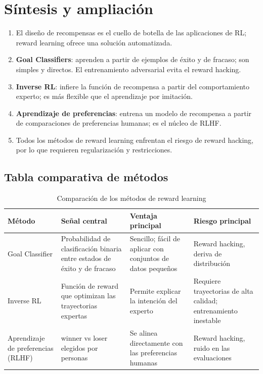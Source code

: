 \section{Síntesis y ampliación}

\begin{enumerate}
    \item El diseño de recompensas es el cuello de botella de las aplicaciones de RL; reward learning ofrece una solución automatizada.
    \item \textbf{Goal Classifiers}: aprenden a partir de ejemplos de éxito y de fracaso; son simples y directos. El entrenamiento adversarial evita el reward hacking.
    \item \textbf{Inverse RL}: infiere la función de recompensa a partir del comportamiento experto; es más flexible que el aprendizaje por imitación.
    \item \textbf{Aprendizaje de preferencias}: entrena un modelo de recompensa a partir de comparaciones de preferencias humanas; es el núcleo de RLHF.
    \item Todos los métodos de reward learning enfrentan el riesgo de reward hacking, por lo que requieren regularización y restricciones.
\end{enumerate}

\subsection{Tabla comparativa de métodos}

\begin{table}[H]
\centering
\begin{tabular}{p{} p{} p{} p{}}
\toprule
Método & Señal central & Ventaja principal & Riesgo principal \\
\midrule
Goal Classifier & Probabilidad de clasificación binaria entre estados de éxito y de fracaso & Sencillo; fácil de aplicar con conjuntos de datos pequeños & Reward hacking, deriva de distribución \\
Inverse RL & Función de reward que optimizan las trayectorias expertas & Permite explicar la intención del experto & Requiere trayectorias de alta calidad; entrenamiento inestable \\
Aprendizaje de preferencias (RLHF) & winner vs loser elegidos por personas & Se alinea directamente con las preferencias humanas & Reward hacking, ruido en las evaluaciones \\
\bottomrule
\end{tabular}
\caption{Comparación de los métodos de reward learning}
\end{table}

